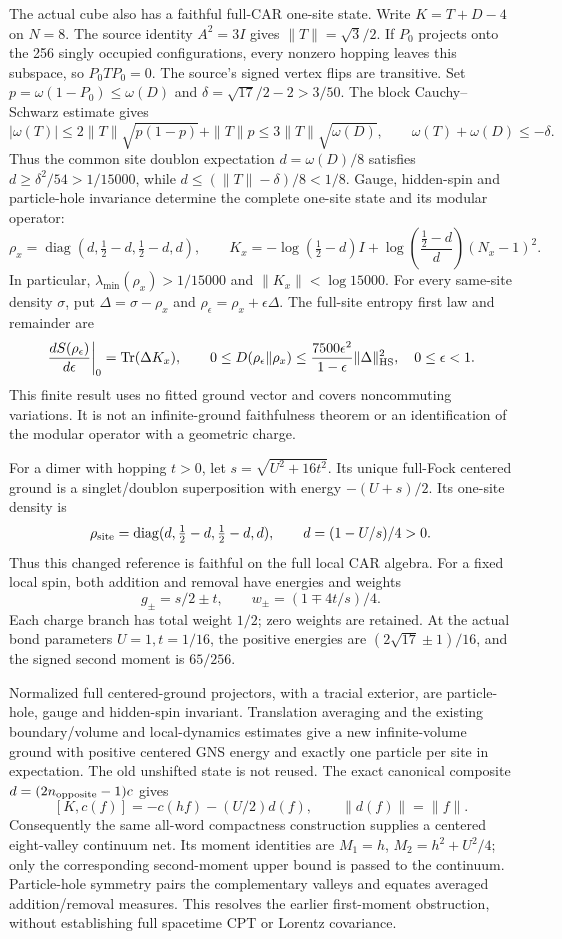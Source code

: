 The actual cube also has a faithful full-CAR one-site state. Write
$K=T+D-4$ on $N=8$. The source identity $A^2=3I$ gives
$\|T\|=\sqrt3/2$. If $P_0$ projects onto the 256 singly occupied
configurations, every nonzero hopping leaves this subspace, so
$P_0TP_0=0$. The source's signed vertex flips are transitive. Set
$p=\omega(1-P_0)\le\omega(D)$ and
$\delta=\sqrt{17}/2-2>3/50$. The block Cauchy--Schwarz estimate gives
\[
 |\omega(T)|\le2\|T\|\sqrt{p(1-p)}+\|T\|p
 \le3\|T\|\sqrt{\omega(D)},\qquad
 \omega(T)+\omega(D)\le-\delta.
\]
Thus the common site doublon expectation $d=\omega(D)/8$ satisfies
$d\ge\delta^2/54>1/15000$, while
$d\le(\|T\|-\delta)/8<1/8$. Gauge, hidden-spin and particle-hole
invariance determine the complete one-site state and its modular operator:
\[
 \rho_x=\operatorname{diag}(d,\tfrac12-d,\tfrac12-d,d),\qquad
 K_x=-\log(\tfrac12-d)I+
 \log\!\left(\frac{\tfrac12-d}{d}\right)(N_x-1)^2.
\]
In particular, $\lambda_{\min}(\rho_x)>1/15000$ and
$\|K_x\|<\log15000$. For every same-site density $\sigma$, put
$\Delta=\sigma-\rho_x$ and $\rho_\epsilon=\rho_x+\epsilon\Delta$.
The full-site entropy first law and remainder are
\[
 \left.\frac{dS(\rho_\epsilon)}{d\epsilon}\right|_0
 =\operatorname{Tr}(\Delta K_x),\qquad
 0\le D(\rho_\epsilon\Vert\rho_x)
 \le\frac{7500\epsilon^2}{1-\epsilon}\|\Delta\|_{\rm HS}^2,
 \quad 0\le\epsilon<1.
\]
This finite result uses no fitted ground vector and covers noncommuting
variations. It is not an infinite-ground faithfulness theorem or an
identification of the modular operator with a geometric charge.

For a dimer with hopping $t>0$, let $s=\sqrt{U^2+16t^2}$. Its unique
full-Fock centered ground is a singlet/doublon superposition with energy
$-(U+s)/2$. Its one-site density is
\[
 \rho_{\rm site}=\operatorname{diag}
 (d,\tfrac12-d,\tfrac12-d,d),\qquad d=(1-U/s)/4>0.
\]
Thus this changed reference is faithful on the full local CAR algebra.
For a fixed local spin, both addition and removal have energies and weights
\[
 g_\pm=s/2\pm t,\qquad w_\pm=(1\mp4t/s)/4.
\]
Each charge branch has total weight $1/2$; zero weights are retained.
At the actual bond parameters $U=1,t=1/16$, the positive energies are
$(2\sqrt{17}\pm1)/16$, and the signed second moment is $65/256$.

Normalized full centered-ground projectors, with a tracial exterior,
are particle-hole, gauge and hidden-spin invariant. Translation averaging
and the existing boundary/volume and local-dynamics estimates give a
new infinite-volume ground with positive centered GNS energy and exactly
one particle per site in expectation. The old unshifted state is not reused. The exact
canonical composite $d=(2n_{\rm opposite}-1)c$ gives
\[
 [K,c(f)]=-c(hf)-(U/2)d(f),\qquad \|d(f)\|=\|f\|.
\]
Consequently the same all-word compactness construction supplies a centered
eight-valley continuum net. Its moment identities are
$M_1=h$, $M_2=h^2+U^2/4$; only the corresponding second-moment upper
bound is passed to the continuum. Particle-hole symmetry pairs the
complementary valleys and equates averaged addition/removal measures.
This resolves the earlier first-moment obstruction, without establishing
full spacetime CPT or Lorentz covariance.

